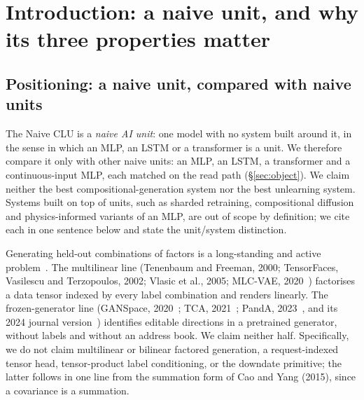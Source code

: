 \documentclass{article} %
\begin{document}
\section{Introduction: a naive unit, and why its three properties matter}
\label{sec:intro}

\subsection{Positioning: a naive unit, compared with naive units}
\label{sec:positioning}

The Naive CLU is a \emph{naive AI unit}: one model with no system built around it, in the sense
in which an MLP, an LSTM or a transformer is a unit. We therefore compare it only with other naive
units: an MLP, an LSTM, a transformer and a continuous-input MLP, each matched on the read path
(\S\ref{sec:object}). We claim neither the best compositional-generation system nor the best
unlearning system. Systems built on top of units, such as sharded retraining, compositional
diffusion and physics-informed variants of an MLP, are out of scope by definition; we cite each
in one sentence below and state the unit/system distinction.

Generating held-out combinations of factors is a long-standing and active problem~\citep{du2020compositional,liu2022compositional}. The multilinear line (Tenenbaum and Freeman, 2000\nocite{tenenbaum2000separating}; TensorFaces,
Vasilescu and Terzopoulos, 2002\nocite{vasilescu2002tensorfaces}; Vlasic et al., 2005\nocite{vlasic2005face}; MLC-VAE, 2020~\citep{georgopoulos2020multilinear}) factorises a data tensor
indexed by every label combination and renders linearly. The frozen-generator line (GANSpace,
2020~\citep{harkonen2020ganspace}; TCA, 2021~\citep{oldfield2021tensor}; PandA, 2023~\citep{oldfield2023panda}, and its 2024 journal version~\citep{oldfield2024bilinear}) identifies editable directions in a
pretrained generator, without labels and without an address book. We claim neither half.
Specifically, we do not claim multilinear or bilinear factored generation, a request-indexed
tensor head, tensor-product label conditioning, or the downdate primitive; the latter follows
in one line from the summation form of Cao and Yang (2015)\nocite{cao2015towards}, since a covariance is a summation.
\end{document}
